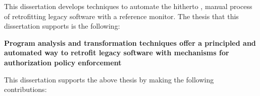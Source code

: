 This dissertation develops techniques to automate the hitherto \adhoc, manual
process of retrofitting legacy software with a reference monitor.  The thesis
that this dissertation supports is the following:

\begin{center}
\newsavebox{\thesisstatement}
\begin{lrbox}{\thesisstatement}
\begin{minipage}[ht]{6.0in}
\textbf{Program analysis and transformation techniques offer a
principled and automated way to retrofit legacy software with mechanisms 
for authorization policy enforcement}
\end{minipage}
\end{lrbox}\fbox{\usebox{\thesisstatement}}
\end{center}

This dissertation supports the above thesis by making the following
contributions:

